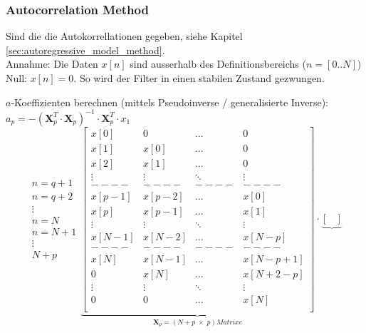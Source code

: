 \subsubsection{Autocorrelation Method }
Sind die die Autokorrellationen gegeben, siehe Kapitel \ref{sec:autoregressive_model_method}.\\
Annahme: Die Daten $x[n]$ sind ausserhalb des Definitionsbereichs ($n=[0..N]$) Null: $x[n]=0$. So wird der Filter in einen stabilen Zustand gezwungen.
\renewcommand{\arraystretch}{1.0}

\begin{aufzaehlung}
	\item $a$-Koeffizienten berechnen (mittels Pseudoinverse / generalisierte Inverse): $a_p = -\left(\bm X_p^T \cdot \bm  X_p\right)^{-1} \cdot \bm X_p^T \cdot x_1$
  		 \small
			$$
		\begin{matrix} n=q+1\\ n=q+2\\ \vdots \\ n=N\\ n=N+1\\ \vdots \\ N+p
		\end{matrix}
		\underbrace{\begin{bmatrix}
    		x[0] & 0 & \hdots & 0 \\ 
    		x[1] & x[0] & \hdots & 0 \\ 
    		x[2] & x[1] & \hdots & 0 \\        
    		\vdots & \vdots & \ddots & \vdots \\
    		----&----&----&----\\                
    		x[p-1] & x[p-2] & \hdots & x[0] \\                                   
    		x[p] & x[p-1] & \hdots & x[1] \\      
    		\vdots & \vdots & \ddots & \vdots \\                        
    		x[N-1] & x[N-2] & \hdots & x[N-p] \\ 
    		----&----&----&----\\                            
    		x[N] & x[N-1] & \hdots & x[N-p+1] \\ 
    		0 & x[N] & \hdots & x[N+2-p] \\
    		\vdots & \vdots & \ddots & \vdots \\                     
    		0 & 0 & \hdots & x[N] \\
		\end{bmatrix}  }_{\bm X_p=(N+p \; \times \; p) Matrixe} \cdot \underbrace{\begin{bmatrix}

\end{bmatrix}}$$
\end{aufzaehlung}
